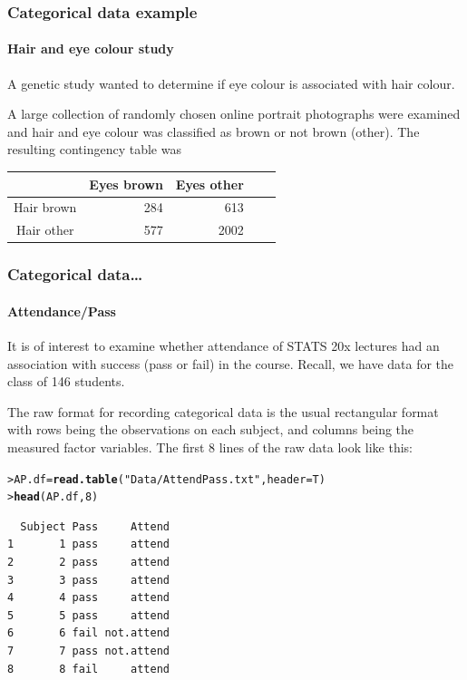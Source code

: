 \documentclass{beamer}\usepackage[]{graphicx}\usepackage[]{xcolor}
\makeatletter
\newcommand{\hlnum}[1]{\textcolor[rgb]{0.686,0.059,0.569}{#1}}%
\newcommand{\hlstr}[1]{\textcolor[rgb]{0.192,0.494,0.8}{#1}}%
\newcommand{\hlstd}[1]{\textcolor[rgb]{0.345,0.345,0.345}{#1}}%
\newcommand{\hlkwb}[1]{\textcolor[rgb]{0.69,0.353,0.396}{#1}}%
\newcommand{\hlkwc}[1]{\textcolor[rgb]{0.333,0.667,0.333}{#1}}%
\newcommand{\hlkwd}[1]{\textcolor[rgb]{0.737,0.353,0.396}{\textbf{#1}}}%
\newenvironment{kframe}{%
 \def\at@end@of@kframe{}%
 \ifinner\ifhmode%
  \def\at@end@of@kframe{\end{minipage}}%
  \begin{minipage}{\columnwidth}%
 \fi\fi%
 \def\FrameCommand##1{\hskip\@totalleftmargin \hskip-\fboxsep
 \colorbox{shadecolor}{##1}\hskip-\fboxsep
     \hskip-\linewidth \hskip-\@totalleftmargin \hskip\columnwidth}%
 \MakeFramed {\advance\hsize-\width
   \@totalleftmargin\z@ \linewidth\hsize
   \@setminipage}}%
 {\par\unskip\endMakeFramed%
 \at@end@of@kframe}
\newenvironment{knitrout}{}{} %
\makeatother
\begin{document}
\begin{frame}
\frametitle{Categorical data example}
\framesubtitle{Hair and eye colour study}

A genetic study wanted to determine if eye colour is associated with hair colour. 
\bigskip

A large collection of randomly chosen online  portrait photographs were examined and hair and eye colour was classified as brown or not brown (other). The resulting contingency table was

\bigskip

\medskip

\begin{tabular}{c|rrrr}
              & Eyes brown & Eyes other\\ \hline
Hair brown    &  284       & 613    \\
Hair other    &  577       & 2002    \\ \hline
\end{tabular}
\end{frame}



\begin{frame}[label=Attendance1,fragile]
\frametitle{Categorical data\ldots}
\framesubtitle{Attendance/Pass}

It is of interest to examine whether attendance  of STATS 20x lectures had an association with success (pass or fail) in the course. Recall, we have data for the class of 146 students.

\bigskip

The raw format for recording categorical data is the usual rectangular format with rows being the observations on each subject, and columns being the measured factor variables. The first 8 lines of the raw data look like this:

\begin{knitrout}\scriptsize
{}\color{fgcolor}\begin{kframe}
\begin{alltt}
\hlstd{> }\hlstd{AP.df} \hlkwb{=} \hlkwd{read.table}\hlstd{(}\hlstr{"Data/AttendPass.txt"}\hlstd{,}\hlkwc{header}\hlstd{=T)}
\hlstd{> }\hlkwd{head}\hlstd{(AP.df,} \hlnum{8}\hlstd{)}
\end{alltt}
\begin{verbatim}
  Subject Pass     Attend
1       1 pass     attend
2       2 pass     attend
3       3 pass     attend
4       4 pass     attend
5       5 pass     attend
6       6 fail not.attend
7       7 pass not.attend
8       8 fail     attend
\end{verbatim}
\end{kframe}
\end{knitrout}

\end{frame}
\end{document}
